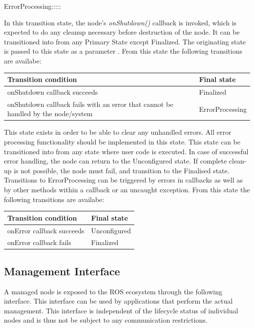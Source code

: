 \begin{labeling}{ErrorProcessing:::::}
		\item[\textbf{ShuttingDown}] In this transition state, the node's \textit{onShutdown()} callback is invoked, which is expected to do any cleanup necessary before destruction of the node. It can be transitioned into from any Primary State except Finalized. The originating state is passed to this state as a parameter .
		From this state the following transitions are availabe:
		\begin{table}[H]
			\flushright
			\label{tab:Valid transitions}
			\begin{tabular}{|p{8.5cm}|p{3cm}|}
				\toprule
				Transition condition & Final state\\
				\midrule
				onShutdown callback succeeds & Finalized \\
				onShutdown callback fails with an error that cannot be handled by the node/system  & ErrorProcessing \\
				\bottomrule
			\end{tabular}
		\end{table}

		\item[\textbf{ErrorProcessing}] This state exists in order to be able to clear any unhandled errors.  All error processing functionality should be implemented in this state. This state can be transitioned into from any state where user code is executed. In case of successful error handling, the node can return to the Unconfigured state. If complete clean-up is not possible, the node must fail, and transition to the Finalised state. Transitions to ErrorProcessing can be triggered by errors in callbacks as well as by other methods within a callback or an uncaught exception.
		From this state the following transitions are availabe:
		\begin{table}[H]
			\flushright
			\label{tab:Valid transitions}
			\begin{tabular}{|p{8.5cm}|p{3cm}|}
				\toprule
				Transition condition & Final state\\
				\midrule
				onError callback succeeds & Unconfigured \\
				onError callback fails & Finalized \\
				\bottomrule
			\end{tabular}
		\end{table}

	\end{labeling}

	\subsection{Management Interface}
	A managed node is exposed to the ROS ecosystem through the following interface. This interface can be used by applications that perform the actual management. This interface is independent of the lifecycle status of individual nodes and is thus not be subject to any communication restrictions.

